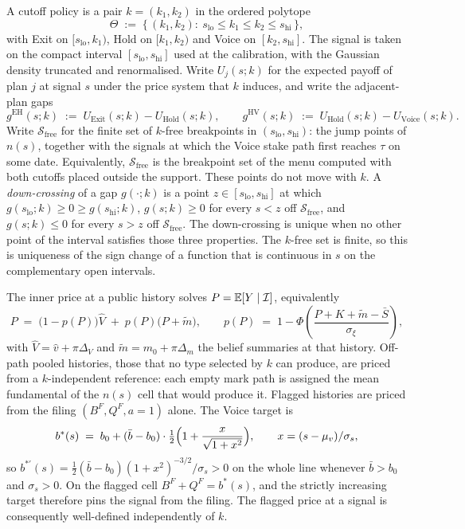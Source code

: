 A cutoff policy is a pair $k=(k_1,k_2)$ in the ordered polytope
\begin{equation}
\label{eq:ex-theta}
\Theta \;:=\; \bigl\{\, (k_1,k_2):\ s_{\mathrm{lo}}\le k_1\le k_2\le s_{\mathrm{hi}} \,\bigr\},
\end{equation}
with Exit on $[s_{\mathrm{lo}},k_1)$, Hold on $[k_1,k_2)$ and Voice on $[k_2,s_{\mathrm{hi}}]$. The
signal is taken on the compact interval $[s_{\mathrm{lo}},s_{\mathrm{hi}}]$ used at the calibration,
with the Gaussian density truncated and renormalised. Write $U_j(s;k)$ for the expected payoff of
plan $j$ at signal $s$ under the price system that $k$ induces, and write the adjacent-plan gaps
\begin{equation}
\label{eq:ex-gaps}
g^{\mathrm{EH}}(s;k) \;:=\; U_{\mathrm{Exit}}(s;k)-U_{\mathrm{Hold}}(s;k),
\qquad
g^{\mathrm{HV}}(s;k) \;:=\; U_{\mathrm{Hold}}(s;k)-U_{\mathrm{Voice}}(s;k).
\end{equation}
Write $\mathcal S_{\mathrm{free}}$ for the finite set of $k$-free breakpoints in
$(s_{\mathrm{lo}},s_{\mathrm{hi}})$: the jump points of $n(s)$, together with the signals at which
the Voice stake path first reaches $\tau$ on some date. Equivalently, $\mathcal S_{\mathrm{free}}$
is the breakpoint set of the menu computed with both cutoffs placed outside the support. These
points do not move with $k$. A \emph{down-crossing} of a gap $g(\cdot;k)$ is a point
$z\in[s_{\mathrm{lo}},s_{\mathrm{hi}}]$ at which $g(s_{\mathrm{lo}};k)\ge 0\ge g(s_{\mathrm{hi}};k)$,
$g(s;k)\ge 0$ for every $s<z$ off $\mathcal S_{\mathrm{free}}$, and $g(s;k)\le 0$ for every $s>z$
off $\mathcal S_{\mathrm{free}}$. The down-crossing is unique when no other point of the interval
satisfies those three properties. The $k$-free set is finite, so this is uniqueness of the sign
change of a function that is continuous in $s$ on the complementary open intervals.

The inner price at a public history solves $P=\mathbb{E}[Y\mid\mathcal I]$, equivalently
\begin{equation}
\label{eq:ex-inner}
P \;=\; \bigl(1-p(P)\bigr)\hat V \;+\; p(P)\bigl(P+\tilde m\bigr),
\qquad
p(P) \;=\; 1-\Phi\!\left(\frac{P+K+\tilde m-\bar S}{\sigma_\xi}\right),
\end{equation}
with $\hat V=\hat v+\pi\Delta_V$ and $\tilde m=m_0+\pi\Delta_m$ the belief summaries at that
history. Off-path pooled histories, those that no type selected by $k$ can produce, are priced from
a $k$-independent reference: each empty mark path is assigned the mean fundamental of the $n(s)$
cell that would produce it. Flagged histories are priced from the filing $(B^F,Q^F,a{=}1)$ alone.
The Voice target is
\begin{equation}
\label{eq:ex-bstar}
b^*(s) \;=\; b_0+(\bar b-b_0)\cdot\tfrac12\Bigl(1+\frac{x}{\sqrt{1+x^2}}\Bigr),
\qquad x=(s-\mu_v)/\sigma_s,
\end{equation}
so $b^{*\prime}(s)=\tfrac12(\bar b-b_0)(1+x^2)^{-3/2}/\sigma_s>0$ on the whole line whenever
$\bar b>b_0$ and $\sigma_s>0$. On the flagged cell $B^F+Q^F=b^*(s)$, and the strictly increasing
target therefore pins the signal from the filing. The flagged price at a signal is consequently
well-defined independently of $k$.

